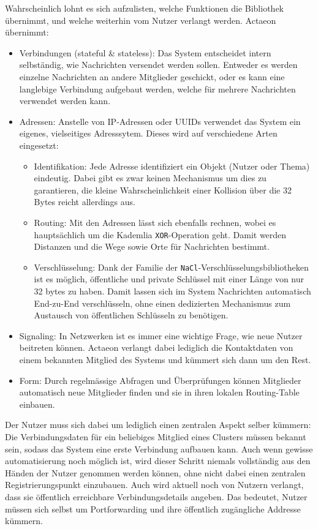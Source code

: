 \documentclass[a4paper,11pt,titlepage,twoside]{memoir}
\begin{document}
\noindent Wahrscheinlich lohnt es sich aufzulisten, welche Funktionen
die Bibliothek übernimmt, und welche weiterhin vom Nutzer verlangt
werden. Actaeon übernimmt:
\begin{itemize}
\item Verbindungen (stateful \& stateless): Das System entscheidet intern
selbständig, wie Nachrichten versendet werden sollen. Entweder es
werden einzelne Nachrichten an andere Mitglieder geschickt, oder es
kann eine langlebige Verbindung aufgebaut werden, welche für mehrere
Nachrichten verwendet werden kann.
\item Adressen: Anstelle von IP-Adressen oder UUIDs verwendet das System
ein eigenes, vielseitiges Adresssytem. Dieses wird auf verschiedene
Arten eingesetzt:
\begin{itemize}
\item Identifikation: Jede Adresse identifiziert ein Objekt (Nutzer oder
Thema) eindeutig. Dabei gibt es zwar keinen Mechanismus um dies zu
garantieren, die kleine Wahrscheinlichkeit einer Kollision über
die 32 Bytes reicht allerdings aus.
\item Routing: Mit den Adressen lässt sich ebenfalls rechnen, wobei es
hauptsächlich um die Kademlia \texttt{XOR}-Operation geht. Damit werden
Distanzen und die Wege sowie Orte für Nachrichten bestimmt.
\item Verschlüsselung: Dank der Familie der
\texttt{NaCl}-Verschlüsselungsbibliotheken ist es möglich, öffentliche und
private Schlüssel mit einer Länge von nur 32 bytes zu haben. Damit
lassen sich im System Nachrichten automatisch End-zu-End
verschlüsseln, ohne einen dedizierten Mechanismus zum Austausch
von öffentlichen Schlüsseln zu benötigen.
\end{itemize}
\item Signaling: In Netzwerken ist es immer eine wichtige Frage, wie neue
Nutzer beitreten können. Actaeon verlangt dabei lediglich die
Kontaktdaten von einem bekannten Mitglied des Systems und kümmert
sich dann um den Rest.
\item Form: Durch regelmässige Abfragen und Überprüfungen können
Mitglieder automatisch neue Mitglieder finden und sie in ihren
lokalen Routing-Table einbauen.
\end{itemize}

\noindent Der Nutzer muss sich dabei um lediglich einen zentralen
Aspekt selber kümmern: Die Verbindungsdaten für ein beliebiges
Mitglied eines Clusters müssen bekannt sein, sodass das System eine
erste Verbindung aufbauen kann. Auch wenn gewisse automatisierung noch
möglich ist, wird dieser Schritt niemals vollständig aus den Händen
der Nutzer genommen werden können, ohne nicht dabei einen zentralen
Registrierungspunkt einzubauen. Auch wird aktuell noch von Nutzern
verlangt, dass sie öffentlich erreichbare Verbindungsdetails angeben.
Das bedeutet, Nutzer müssen sich selbst um Portforwarding und ihre
öffentlich zugängliche Addresse kümmern.\\
\end{document}

